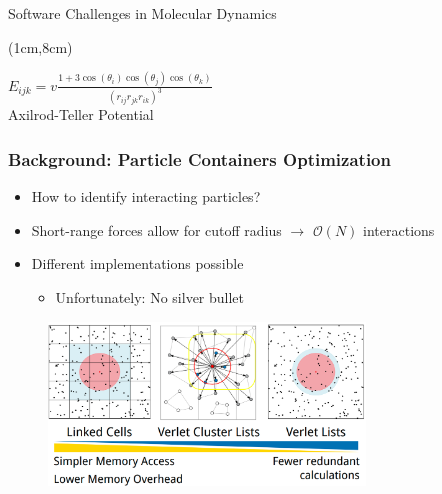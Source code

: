 \documentclass[
	10pt,
	t		%
]{beamer}
\begin{document}
\begin{frame}{Software Challenges in Molecular Dynamics}
    \begin{textblock*}{5cm}(1cm,8cm)
        \begin{center}

            $E_{ijk} = v \frac{1 + 3 \cos(\theta_i) \cos(\theta_j) \cos(\theta_k)}{(r_{ij} r_{jk} r_{ik})^3}$\\
            \vspace{0.2cm}
            \tiny{Axilrod-Teller Potential}
        \end{center}
    \end{textblock*}

\end{frame}

\begin{frame}
    \frametitle{Background: Particle Containers Optimization}

    \begin{itemize}
        \item How to identify interacting particles?
        \item Short-range forces allow for cutoff radius $\rightarrow$ $\mathcal{O}(N)$ interactions
        \item Different implementations possible
              \begin{itemize}
                  \item Unfortunately: No silver bullet
              \end{itemize}
    \end{itemize}

    \vspace{0.2cm}
    \begin{figure}
        \centering
        \includegraphics[width=0.75\textwidth]{figures/particle_containers.png}
        \caption{\small{
                \cite{SIAM_PP24}}}
    \end{figure}


\end{frame}
\end{document}
